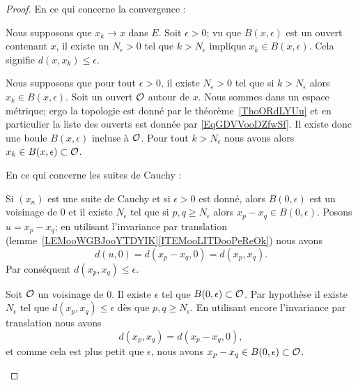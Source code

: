\begin{proof}
   En ce qui concerne la convergence :
    \begin{subproof}
        \item[Sens direct]

            Nous supposons que \( x_k\to x\) dans \( E\). Soit \( \epsilon>0\); vu que \( B(x,\epsilon)\) est un ouvert contenant \( x\), il existe un \( N_{\epsilon}>0 \) tel que \( k>N_{\epsilon}\) implique \( x_k\in B(x,\epsilon)\). Cela signifie \( d(x,x_k)\leq \epsilon\).

        \item[Réciproque]

            Nous supposons que pour tout \( \epsilon>0\), il existe \( N_{\epsilon}>0\) tel que si \( k>N_{\epsilon}\) alors \( x_k\in B(x,\epsilon)\). Soit un ouvert \( \mathcal{O}\) autour de \( x\). Nous sommes dans un espace métrique; ergo la topologie est donné par le théorème~\ref{ThoORdLYUu} et en particulier la liste des ouverts est donnée par \eqref{EqGDVVooDZfwSf}. Il existe donc une boule \( B(x,\epsilon)\) incluse à \( \mathcal{O}\). Pour tout \( k>N_{\epsilon}\) nous avons alors \( x_k\in B(x,\epsilon)\subset\mathcal{O}\).
    \end{subproof}
    En ce qui concerne les suites de Cauchy :
    \begin{subproof}
    \item[Sens direct]
        Si \( (x_n)\) est une suite de Cauchy et si \( \epsilon>0\) est donné, alors \( B(0,\epsilon)\) est un voisinage de \( 0\) et il existe \( N_{\epsilon}\) tel que si \( p,q\geq N_{\epsilon}\) alors \( x_p-x_q\in B(0,\epsilon)\). Posons \( u=x_p-x_q\); en utilisant l'invariance par translation (lemme~\ref{LEMooWGBJooYTDYIK}\ref{ITEMooLITDooPeReOk}) nous avons
        \begin{equation}
            d(u,0)=d(x_p-x_q,0)=d(x_p,x_q).
        \end{equation}
        Par conséquent \( d(x_p,x_q)\leq \epsilon\).
    \item[Réciproque]
        Soit \( \mathcal{O}\) un voisinage de \( 0\). Il existe \( \epsilon\) tel que \( B(0,\epsilon)\subset \mathcal{O}\). Par hypothèse il existe \( N_{\epsilon}\) tel que \( d(x_p,x_q)\leq \epsilon\) dès que \( p,q\geq N_{\epsilon}\). En utilisant encore l'invariance par translation nous avons
        \begin{equation}
            d(x_p,x_q)=d(x_p-x_q,0),
        \end{equation}
        et comme cela est plus petit que \( \epsilon\), nous avons \( x_p-x_q\in B(0,\epsilon)\subset\mathcal{O}\).
    \end{subproof}
\end{proof}

